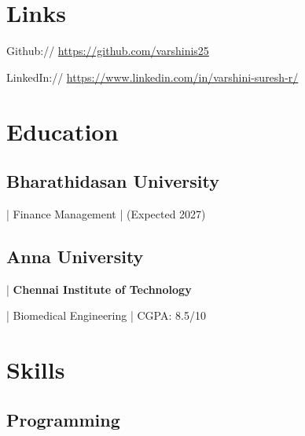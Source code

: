 \documentclass[]{deedy-resume-reversed}
\begin{document}
\begin{minipage}[t]{0.65\textwidth}
\sectionsep


\section{Links}

Github://
\href{https://github.com/varshinis25}{https://github.com/varshinis25}

LinkedIn://
\href{https://www.linkedin.com/in/varshini-suresh-r/}{https://www.linkedin.com/in/varshini-suresh-r/}

\end{minipage}
\hfill
\begin{minipage}[t]{0.30\textwidth}


\section{Education}

\subsection{Bharathidasan University}

 | {Finance Management | (Expected 2027)}



\subsection{Anna University} | {\textbf{Chennai Institute of Technology}}

 | {Biomedical Engineering | CGPA: 8.5/10}


\sectionsep


\section{Skills}

\subsection{Programming}


\end{minipage}
\end{document}

